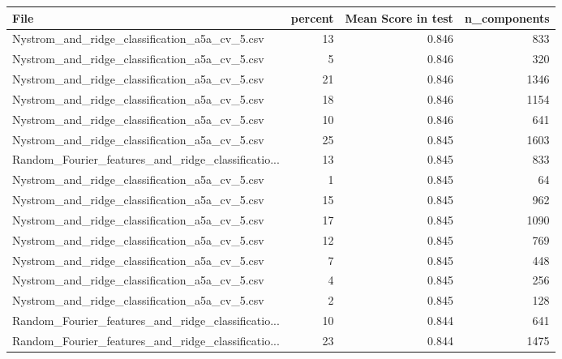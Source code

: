 \begin{tabularx}{\textwidth}{lrrr}
\toprule
                                              File &  percent &  Mean Score in test &  n\_components \\
\midrule
     Nystrom\_and\_ridge\_classification\_a5a\_cv\_5.csv &       13 &               0.846 &           833 \\
     Nystrom\_and\_ridge\_classification\_a5a\_cv\_5.csv &        5 &               0.846 &           320 \\
     Nystrom\_and\_ridge\_classification\_a5a\_cv\_5.csv &       21 &               0.846 &          1346 \\
     Nystrom\_and\_ridge\_classification\_a5a\_cv\_5.csv &       18 &               0.846 &          1154 \\
     Nystrom\_and\_ridge\_classification\_a5a\_cv\_5.csv &       10 &               0.846 &           641 \\
     Nystrom\_and\_ridge\_classification\_a5a\_cv\_5.csv &       25 &               0.845 &          1603 \\
Random\_Fourier\_features\_and\_ridge\_classificatio... &       13 &               0.845 &           833 \\
     Nystrom\_and\_ridge\_classification\_a5a\_cv\_5.csv &        1 &               0.845 &            64 \\
     Nystrom\_and\_ridge\_classification\_a5a\_cv\_5.csv &       15 &               0.845 &           962 \\
     Nystrom\_and\_ridge\_classification\_a5a\_cv\_5.csv &       17 &               0.845 &          1090 \\
     Nystrom\_and\_ridge\_classification\_a5a\_cv\_5.csv &       12 &               0.845 &           769 \\
     Nystrom\_and\_ridge\_classification\_a5a\_cv\_5.csv &        7 &               0.845 &           448 \\
     Nystrom\_and\_ridge\_classification\_a5a\_cv\_5.csv &        4 &               0.845 &           256 \\
     Nystrom\_and\_ridge\_classification\_a5a\_cv\_5.csv &        2 &               0.845 &           128 \\
Random\_Fourier\_features\_and\_ridge\_classificatio... &       10 &               0.844 &           641 \\
Random\_Fourier\_features\_and\_ridge\_classificatio... &       23 &               0.844 &          1475 \\

\end{tabularx}
